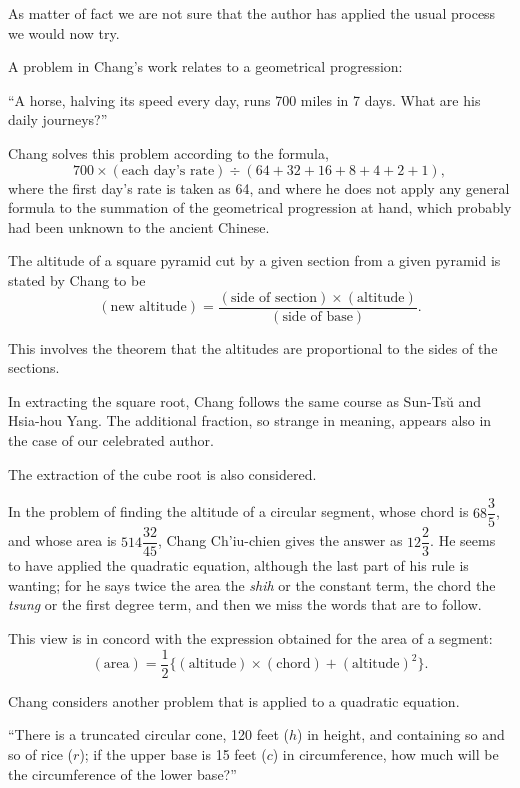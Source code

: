 \documentclass[11pt]{article}
\newcommand{\scanpage}[2]{\clearpage\setcounter{footnote}{0}\noindent{\footnotesize\color{gray}PDF page #1 · #2}\par\medskip}
\newcommand{\scanfooter}{}
\begin{document}
As matter of fact we are not sure that the author has applied the usual process we would now try.

A problem in Chang's work relates to a geometrical progression:

``A horse, halving its speed every day, runs 700 miles in 7 days. What are his daily journeys?''

Chang solves this problem according to the formula,
\[
700\times(\text{each day's rate})\div(64+32+16+8+4+2+1),
\]
where the first day's rate is taken as 64, and where he does not apply any general formula to the summation of the geometrical progression at hand, which probably had been unknown to the ancient Chinese.

The altitude of a square pyramid cut by a given section from a given pyramid is stated by Chang to be
\[
(\text{new altitude})=\frac{(\text{side of section})\times(\text{altitude})}{(\text{side of base})}.
\]

This involves the theorem that the altitudes are proportional to the sides of the sections.

In extracting the square root, Chang follows the same course as Sun-Tsŭ and Hsia-hou Yang. The additional fraction, so strange in meaning, appears also in the case of our celebrated author.

The extraction of the cube root is also considered.

In the problem of finding the altitude of a circular segment, whose chord is $68\dfrac{3}{5}$, and whose area is $514\dfrac{32}{45}$, Chang Ch'iu-chien gives the answer as $12\dfrac{2}{3}$. He seems to have applied the quadratic equation, although the last part of his rule is wanting; for he says twice the area the \emph{shih} or the constant term, the chord the \emph{tsung} or the first degree term, and then we miss the words that are to follow.

This view is in concord with the expression obtained for the area of a segment:
\[
(\text{area})=\frac{1}{2}\{(\text{altitude})\times(\text{chord})+(\text{altitude})^2\}.
\]

Chang considers another problem that is applied to a quadratic equation.

``There is a truncated circular cone, 120 feet ($h$) in height, and containing so and so of rice ($r$); if the upper base is 15 feet ($c$) in circumference, how much will be the circumference of the lower base?''
\scanfooter

\scanpage{0057}{Chapter 6, printed page 43}
\end{document}
